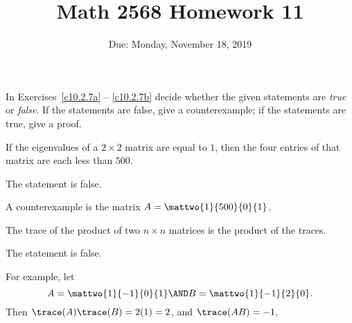 \documentclass{article}
\title{Math 2568 Homework 11}
\author{\phantom{Dr. Golubitsky}}
\date{Due: Monday, November 18, 2019}
\begin{document}
\maketitle


\problemlabel

\noindent In Exercises~\ref{c10.2.7a} -- \ref{c10.2.7b} decide whether 
the given statements are {\em true\/} or {\em false\/}. If the 
statements are false, give a counterexample; if the statements are true, 
give a proof.


\begin{exercise} \label{c10.2.7a}
If the eigenvalues of a $2\times 2$ matrix are equal to $1$,
then the four entries of that matrix are each less than $500$.

\begin{solution}

\ans The statement is false. 

\soln  A counterexample is the matrix $A = \mattwo{1}{500}{0}{1}$.

\end{solution}
\end{exercise}





\problemlabel

\begin{exercise} \label{c10.2.7b}
The trace of the product of two $n\times n$ matrices is the
product of the traces.

\begin{solution}
\ans The statement is false.

\soln For example, let
\[
A = \mattwo{1}{-1}{0}{1} \AND B = \mattwo{1}{-1}{2}{0}.
\]
Then $\trace(A)\trace(B) = 2(1) = 2$, and $\trace(AB) = -1$.

\end{solution}
\end{exercise}



\newpage

\problemlabel
\end{document}
